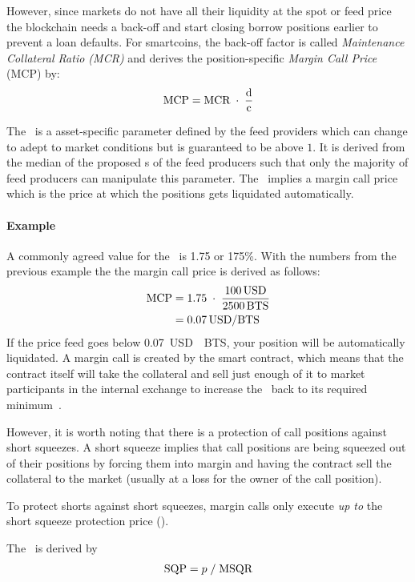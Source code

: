 \label{sec:margincall}

However, since markets do not have all their liquidity at the spot or feed
price the blockchain needs a back-off and start closing borrow positions
earlier to prevent a loan defaults. For smartcoins, the back-off factor is
called \emph{Maintenance Collateral Ratio (MCR)} and derives the
position-specific \emph{Margin Call Price} (MCP) by:
\begin{align}
 \text{MCP} = \text{MCR} \;\cdot\; \frac{\text{d}}{\text{c}}
\end{align}

The \MCR\ is a asset-specific parameter defined by the feed providers which can
change to adept to market conditions but is guaranteed to be above $1$. It is
derived from the median of the proposed \MCR s of the feed producers such that
only the majority of feed producers can manipulate this parameter. The \MCR\ implies 
a margin call price \MCP\, which is the price at which the positions gets liquidated automatically.

\paragraph{Example} A commonly agreed value for the \MCR\ is \num{1.75} or 175\%. With the numbers from the previous example
the the margin call price is derived as follows:
\begin{align}
 \text{MCP} &= 1.75 \;\cdot\; \frac{\SI{100}{USD}}{\SI{2500}{BTS}} \\
      &= \SI{0.07}{USD \per BTS}
\end{align}
If the price feed goes below \SI{0.07}{USD \per BTS}, your position will be
automatically liquidated. A margin call is created by the smart contract, which means that the contract
itself will take the collateral and sell just enough of it to market
participants in the internal exchange to increase the \MCR\ back to its
required minimum~\cite{bsip31}.

However, it is worth noting that there is a protection of call positions
against short squeezes. A short squeeze implies that call positions are being
squeezed out of their positions by forcing them into margin and having the
contract sell the collateral to the market (usually at a loss for the owner of
the call position).

To protect shorts against short squeezes, margin calls only execute
\emph{up to} the short squeeze protection price (\SQP).

The \SQP\ is derived by
\begin{align}
 \text{SQP} = p \;/\; \text{MSQR}
\end{align}

